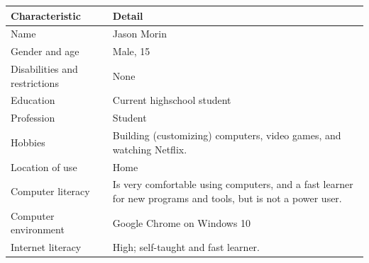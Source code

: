 \documentclass[11pt,onside]{report}
\begin{document}
\begin{center}
    \begin{tabular}{|p{4cm}|p{10cm}|}
        \hline
        \bf{Characteristic} & \bf{Detail} \\
        \hline
        Name & Jason Morin \\
        \hline
        Gender and age & Male, 15 \\
        \hline
        Disabilities and restrictions & None \\
        \hline
        Education & Current highschool student \\
        \hline
        Profession & Student \\
        \hline
        Hobbies & Building (customizing) computers, video games, and watching Netflix. \\
        \hline
        Location of use & Home \\
        \hline
        Computer literacy & Is very comfortable using computers, and a fast learner for new programs and tools, but is not a power user. \\
        \hline
        Computer environment & Google Chrome on Windows 10 \\
        \hline
        Internet literacy &  High; self-taught and fast learner. \\
        \hline
    \end{tabular}
\end{center}
\end{document}
